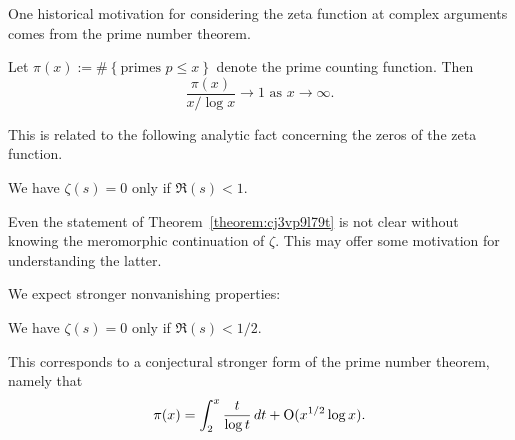 \documentclass[reqno]{amsart}  \numberwithin{theorem}{section} \numberwithin{equation}{section}
\begin{document}
One historical motivation for considering the zeta function at complex arguments comes from the prime number theorem.
\begin{theorem}
  Let $\pi(x) := \# \left\{ \text{primes } p \leq x \right\}$ denote the prime counting function.  Then
  \begin{equation*}
    \frac{\pi(x)}{x / \log x} \rightarrow 1
    \text{ as } x \rightarrow \infty.
  \end{equation*}
\end{theorem}
This is related to the following analytic fact concerning the zeros of the zeta function.
\begin{theorem}\label{theorem:cj3vp9l79t}
We have $\zeta(s) = 0$ only if $\Re(s) < 1$.
\end{theorem}
\begin{remark}
  Even the statement of Theorem~\ref{theorem:cj3vp9l79t} is not clear without knowing the meromorphic continuation of $\zeta$.  This may offer some motivation for understanding the latter.
\end{remark}
We expect stronger nonvanishing properties:
\begin{conjecture}
We have $\zeta(s) = 0$ only if $\Re(s) < 1/2$.
\end{conjecture}
This corresponds to a conjectural stronger form of the prime number theorem, namely that
\begin{equation*}
  \pi(x) = \int_2^x \frac{t}{\log t} \, d t
  + \operatorname{O} (x^{1/2} \log x).
\end{equation*}



{} 
\end{document}

